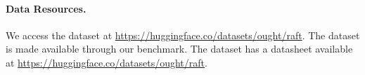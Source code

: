 \paragraph{Data Resources.}
We access the dataset at \url{https://huggingface.co/datasets/ought/raft}.
The dataset is made available through our benchmark.
The dataset has a datasheet available at \url{https://huggingface.co/datasets/ought/raft}.
